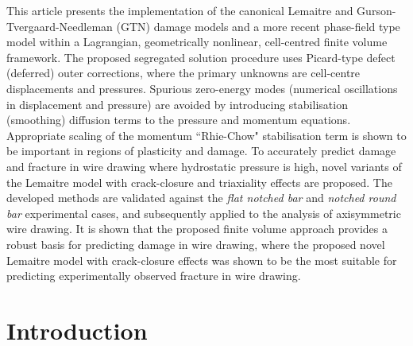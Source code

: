 \documentclass[sn-mathphys,Numbered]{sn-jnl}%
\begin{document}
\abstract
{
This article presents the implementation of the canonical Lemaitre and Gurson-Tvergaard-Needleman (GTN) damage models and a more recent phase-field type model within a Lagrangian, geometrically nonlinear, cell-centred finite volume framework.
The proposed segregated solution procedure uses Picard-type defect (deferred) outer corrections, where the primary unknowns are cell-centre displacements and pressures.
Spurious zero-energy modes (numerical oscillations in displacement and pressure) are avoided by introducing stabilisation (smoothing) diffusion terms to the pressure and momentum equations.
Appropriate scaling of the momentum ``Rhie-Chow" stabilisation term is shown to be important in regions of plasticity and damage.
To accurately predict damage and fracture in wire drawing where hydrostatic pressure is high, novel variants of the Lemaitre model with crack-closure and triaxiality effects are proposed.
The developed methods are validated against the \emph{flat notched bar} and \emph{notched round bar} experimental cases, and subsequently applied to the analysis of axisymmetric wire drawing.
It is shown that the proposed finite volume approach provides a robust basis for predicting damage in wire drawing, where the proposed novel Lemaitre model with crack-closure effects was shown to be the most suitable for predicting experimentally observed fracture in wire drawing.
}




\maketitle


\section{Introduction}\label{sec:intro}
\end{document}
